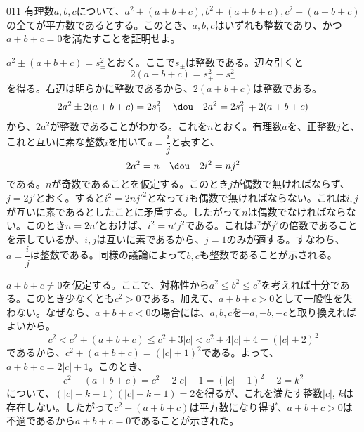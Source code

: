 \begin{thm}{011}{}{}
 有理数$a,b,c$について、$a^2\pm (a+b+c), b^2\pm (a+b+c), c^2\pm (a+b+c)$の全てが平方数であるとする。このとき、$a,b,c$はいずれも整数であり、かつ$a+b+c=0$を満たすことを証明せよ。
\end{thm}

$a^2\pm (a+b+c)=s_\pm^2$とおく。ここで$s_\pm$は整数である。辺々引くと
\[ 2(a+b+c)=s_+^2-s_-^2 \]
を得る。右辺は明らかに整数であるから、$2(a+b+c)$は整数である。
\[ 2a^2\pm 2(a+b+c)=2s_\pm^2 \quad\dou\quad 2a^2=2s_\pm^2\mp 2(a+b+c) \]
から、$2a^2$が整数であることがわかる。これを$n$とおく。有理数$a$を、正整数$j$と、これと互いに素な整数$i$を用いて$a=\dfrac{i}{j}$と表すと、
\[ 2a^2=n \quad\dou\quad 2i^2=nj^2 \]
である。$n$が奇数であることを仮定する。このとき$j$が偶数で無ければならず、$j=2j'$とおく。すると$i^2=2nj'^2$となって$i$も偶数で無ければならない。これは$i, j$が互いに素であるとしたことに矛盾する。したがって$n$は偶数でなければならない。このとき$n=2n'$とおけば、$i^2=n'j^2$である。これは$i^2$が$j^2$の倍数であることを示しているが、$i, j$は互いに素であるから、$j=1$のみが適する。すなわち、$a=\dfrac{i}{j}$は整数である。同様の議論によって$b, c$も整数であることが示される。

$a+b+c\neq 0$を仮定する。ここで、対称性から$a^2\le b^2\le c^2$を考えれば十分である。このとき少なくとも$c^2>0$である。加えて、$a+b+c>0$として一般性を失わない。なぜなら、$a+b+c<0$の場合には、$a, b, c$を$-a, -b, -c$と取り換えればよいから。
\[ c^2 < c^2+(a+b+c) \le c^2+3|c| < c^2+4|c|+4=(|c|+2)^2 \]
であるから、$c^2+(a+b+c)=(|c|+1)^2$である。よって、$a+b+c=2|c|+1$。このとき、
\[ c^2-(a+b+c)=c^2-2|c|-1=(|c|-1)^2-2=k^2 \]
について、$(|c|+k-1)(|c|-k-1)=2$を得るが、これを満たす整数$|c|$, $k$は存在しない。したがって$c^2-(a+b+c)$は平方数になり得ず、$a+b+c>0$は不適であるから$a+b+c=0$であることが示された。

